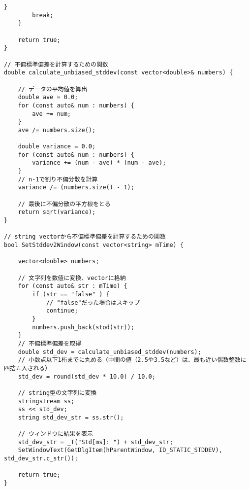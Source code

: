 \begin{lstlisting}[caption=main.cpp]
		}
		break;
	}

	return true;
}

// 不偏標準偏差を計算するための関数
double calculate_unbiased_stddev(const vector<double>& numbers) {

	// データの平均値を算出
	double ave = 0.0;
	for (const auto& num : numbers) {
		ave += num;
	}
	ave /= numbers.size();

	double variance = 0.0;
	for (const auto& num : numbers) {
		variance += (num - ave) * (num - ave);
	}
	// n-1で割り不偏分散を計算
	variance /= (numbers.size() - 1);
	
	// 最後に不偏分散の平方根をとる
	return sqrt(variance);
}

// string vectorから不偏標準偏差を計算するための関数
bool SetStddev2Window(const vector<string> mTime) {

	vector<double> numbers;

	// 文字列を数値に変換、vectorに格納
	for (const auto& str : mTime) {
		if (str == "false" ) {
			// "false"だった場合はスキップ
			continue;
		}
		numbers.push_back(stod(str));
	}
	// 不偏標準偏差を取得
	double std_dev = calculate_unbiased_stddev(numbers);
	// 小数点以下1桁までに丸める（中間の値（2.5や3.5など）は、最も近い偶数整数に四捨五入される）
	std_dev = round(std_dev * 10.0) / 10.0;

	// string型の文字列に変換
	stringstream ss;
	ss << std_dev;
	string std_dev_str = ss.str();

	// ウィンドウに結果を表示
	std_dev_str = _T("Std[ms]: ") + std_dev_str;
	SetWindowText(GetDlgItem(hParentWindow, ID_STATIC_STDDEV), std_dev_str.c_str());

	return true;
}
\end{lstlisting}

